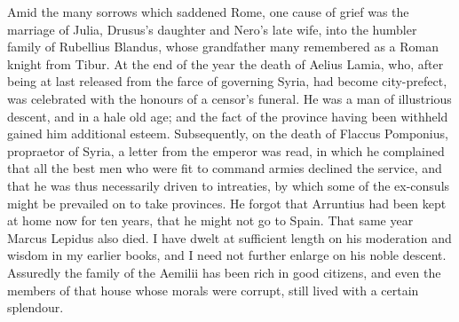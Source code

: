 Amid the many sorrows which saddened Rome, one cause of grief was the marriage of Julia, Drusus's daughter and Nero's late wife, into the humbler family of Rubellius Blandus, whose grandfather many remembered as a Roman knight from Tibur. At the end of the year the death of Aelius Lamia, who, after being at last released from the farce of governing Syria, had become city-prefect, was celebrated with the honours of a censor's funeral. He was a man of illustrious descent, and in a hale old age; and the fact of the province having been withheld gained him additional esteem. Subsequently, on the death of Flaccus Pomponius, propraetor of Syria, a letter from the emperor was read, in which he complained that all the best men who were fit to command armies declined the service, and that he was thus necessarily driven to intreaties, by which some of the ex-consuls might be prevailed on to take provinces. He forgot that Arruntius had been kept at home now for ten years, that he might not go to Spain. That same year Marcus Lepidus also died. I have dwelt at sufficient length on his moderation and wisdom in my earlier books, and I need not further enlarge on his noble descent. Assuredly the family of the Aemilii has been rich in good citizens, and even the members of that house whose morals were corrupt, still lived with a certain splendour.


